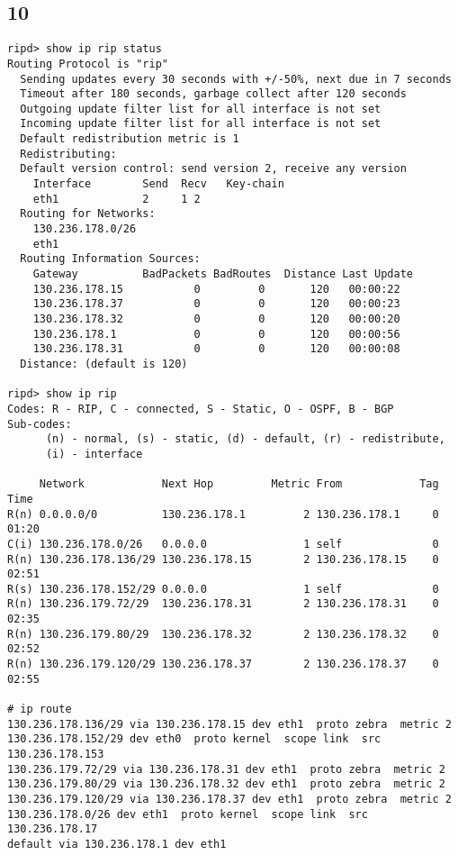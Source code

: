 \subsection{10}
\begin{verbatim}
ripd> show ip rip status
Routing Protocol is "rip"
  Sending updates every 30 seconds with +/-50%, next due in 7 seconds
  Timeout after 180 seconds, garbage collect after 120 seconds
  Outgoing update filter list for all interface is not set
  Incoming update filter list for all interface is not set
  Default redistribution metric is 1
  Redistributing:
  Default version control: send version 2, receive any version
    Interface        Send  Recv   Key-chain
    eth1             2     1 2
  Routing for Networks:
    130.236.178.0/26
    eth1
  Routing Information Sources:
    Gateway          BadPackets BadRoutes  Distance Last Update
    130.236.178.15           0         0       120   00:00:22
    130.236.178.37           0         0       120   00:00:23
    130.236.178.32           0         0       120   00:00:20
    130.236.178.1            0         0       120   00:00:56
    130.236.178.31           0         0       120   00:00:08
  Distance: (default is 120)

ripd> show ip rip
Codes: R - RIP, C - connected, S - Static, O - OSPF, B - BGP
Sub-codes:
      (n) - normal, (s) - static, (d) - default, (r) - redistribute,
      (i) - interface

     Network            Next Hop         Metric From            Tag Time
R(n) 0.0.0.0/0          130.236.178.1         2 130.236.178.1     0 01:20
C(i) 130.236.178.0/26   0.0.0.0               1 self              0
R(n) 130.236.178.136/29 130.236.178.15        2 130.236.178.15    0 02:51
R(s) 130.236.178.152/29 0.0.0.0               1 self              0
R(n) 130.236.179.72/29  130.236.178.31        2 130.236.178.31    0 02:35
R(n) 130.236.179.80/29  130.236.178.32        2 130.236.178.32    0 02:52
R(n) 130.236.179.120/29 130.236.178.37        2 130.236.178.37    0 02:55

# ip route
130.236.178.136/29 via 130.236.178.15 dev eth1  proto zebra  metric 2
130.236.178.152/29 dev eth0  proto kernel  scope link  src 130.236.178.153
130.236.179.72/29 via 130.236.178.31 dev eth1  proto zebra  metric 2
130.236.179.80/29 via 130.236.178.32 dev eth1  proto zebra  metric 2
130.236.179.120/29 via 130.236.178.37 dev eth1  proto zebra  metric 2
130.236.178.0/26 dev eth1  proto kernel  scope link  src 130.236.178.17
default via 130.236.178.1 dev eth1
\end{verbatim}


